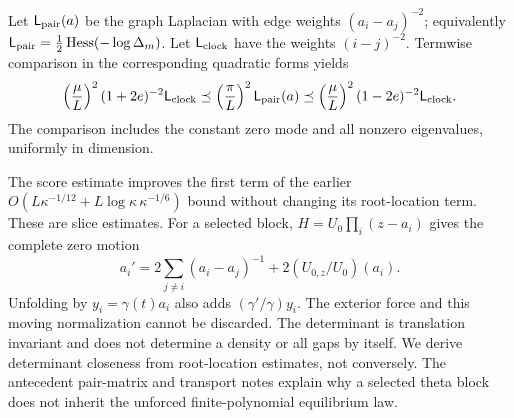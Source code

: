 Let $\mathsf L_{\rm pair}(a)$ be the graph Laplacian with edge weights
$(a_i-a_j)^{-2}$; equivalently
$\mathsf L_{\rm pair}=\tfrac12\operatorname{Hess}(-\log\Delta_m)$.
Let $\mathsf L_{\rm clock}$ have the weights $(i-j)^{-2}$.
Termwise comparison in the corresponding quadratic forms yields
\begin{equation}
 \left(\frac\mu L\right)^2(1+2e)^{-2}\mathsf L_{\rm clock}
 \preceq
 \left(\frac\pi L\right)^2\mathsf L_{\rm pair}(a)
 \preceq
 \left(\frac\mu L\right)^2(1-2e)^{-2}\mathsf L_{\rm clock}.
 \label{eq:Loewner}
\end{equation}
The comparison includes the constant zero mode and all nonzero
eigenvalues, uniformly in dimension.

The score estimate improves the first term of the earlier
$O(L\kappa^{-1/12}+L\log\kappa\,\kappa^{-1/6})$ bound
without changing its root-location term. These are slice estimates. For a selected block,
$H=U_0\prod_i(z-a_i)$ gives the complete zero motion
\begin{equation}
 a_i'=2\sum_{j\ne i}(a_i-a_j)^{-1}
                   +2(U_{0,z}/U_0)(a_i).
 \label{eq:exterior}
\end{equation}
Unfolding by $y_i=\gamma(t)a_i$ also adds
$(\gamma'/\gamma)y_i$.
The exterior force and this moving normalization cannot be discarded.
The determinant is translation invariant and does not determine a
density or all gaps by itself. We derive determinant closeness from
root-location estimates, not conversely.
The antecedent pair-matrix and transport notes
\cite{hdc06,hdc09,lhct07} explain why a selected theta block
does not inherit the unforced finite-polynomial equilibrium law.

